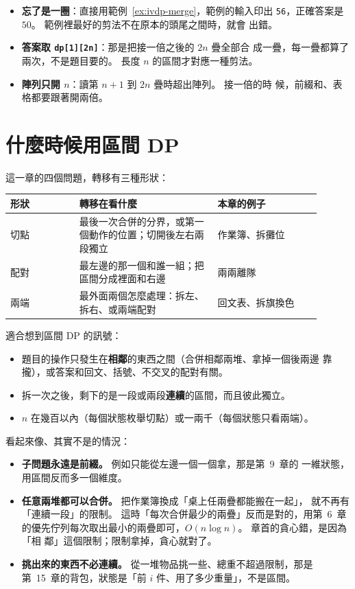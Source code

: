 \begin{itemize}
\item \textbf{忘了是一圈}：直接用範例~\ref{ex:ivdp-merge}，範例的輸入印出
\texttt{56}，正確答案是 $50$。 範例裡最好的剪法不在原本的頭尾之間時，就會
出錯。
\item \textbf{答案取 \texttt{dp[1][2n]}}：那是把接一倍之後的 $2n$ 疊全部合
成一疊，每一疊都算了兩次，不是題目要的。 長度 $n$ 的區間才對應一種剪法。
\item \textbf{陣列只開 $n$}：讀第 $n + 1$ 到 $2n$ 疊時超出陣列。 接一倍的時
候，前綴和、表格都要跟著開兩倍。
\end{itemize}

\section{什麼時候用區間 DP}
\label{sec:ivdp-when}

這一章的四個問題，轉移有三種形狀：

\begin{center}
\begin{tabular}{p{0.2\linewidth}p{0.4\linewidth}p{0.3\linewidth}}
\toprule
形狀 & 轉移在看什麼 & 本章的例子 \\
\midrule
切點 & 最後一次合併的分界，或第一個動作的位置；切開後左右兩段獨立 & 作業簿、拆攤位 \\
配對 & 最左邊的那一個和誰一組；把區間分成裡面和右邊 & 兩兩離隊 \\
兩端 & 最外面兩個怎麼處理：拆左、拆右、或兩端配對 & 回文表、拆旗換色 \\
\bottomrule
\end{tabular}
\end{center}

適合想到區間 DP 的訊號：

\begin{itemize}
\item 題目的操作只發生在\textbf{相鄰}的東西之間（合併相鄰兩堆、拿掉一個後兩邊
靠攏），或答案和回文、括號、不交叉的配對有關。
\item 拆一次之後，剩下的是一段或兩段\textbf{連續}的區間，而且彼此獨立。
\item $n$ 在幾百以內（每個狀態枚舉切點）或一兩千（每個狀態只看兩端）。
\end{itemize}

看起來像、其實不是的情況：

\begin{itemize}
\item \textbf{子問題永遠是前綴。} 例如只能從左邊一個一個拿，那是第~9~章的
一維狀態，用區間反而多一個維度。
\item \textbf{任意兩堆都可以合併。} 把作業簿換成「桌上任兩疊都能搬在一起」，
就不再有「連續一段」的限制。 這時「每次合併最少的兩疊」反而是對的，用第~6~章
的優先佇列每次取出最小的兩疊即可，$O(n \log n)$。 章首的貪心錯，是因為「相
鄰」這個限制；限制拿掉，貪心就對了。
\item \textbf{挑出來的東西不必連續。} 從一堆物品挑一些、總重不超過限制，那是
第~15~章的背包，狀態是「前 $i$ 件、用了多少重量」，不是區間。
\end{itemize}


